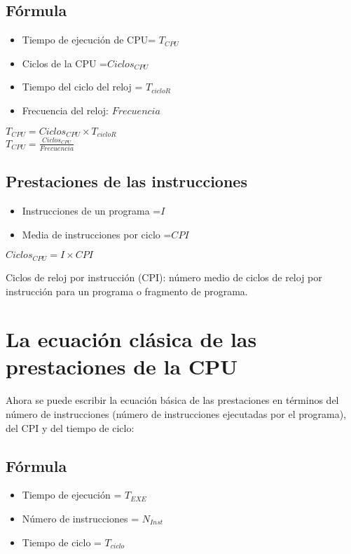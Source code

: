 \documentclass[12pt]{article}
\begin{document}
 \subsection*{Fórmula}
\begin{itemize}
    \item Tiempo de ejecución de CPU= $T_{CPU}$
    \item Ciclos de la CPU =$Ciclos_{CPU}$
    \item  Tiempo del ciclo del reloj = $T_{cicloR}$
    \item Frecuencia del reloj: $Frecuencia$
\end{itemize}

\begin{spacing}{3.0} %
        \begin{center}  
            $T_{CPU} = Ciclos_{CPU} \times T_{cicloR}$\\
            $T_{CPU} = \displaystyle\frac{Ciclos_{CPU}}{Frecuencia}$
        \end{center}
    \end{spacing}
    
\subsection*{ Prestaciones de las instrucciones}
\begin{itemize}
    \item Instrucciones de un programa =$I$
    \item Media de instrucciones por ciclo =$CPI$
\end{itemize}

        \begin{center}  
            $Ciclos_{CPU} = I \times CPI$
        \end{center}

         Ciclos de reloj por instrucción (CPI): número medio de ciclos de reloj 
        por instrucción para un programa o fragmento de programa.
        
    \section{La ecuación clásica de las prestaciones de la CPU}
    Ahora se puede escribir la ecuación básica de las prestaciones en términos del
    número de instrucciones (número de instrucciones ejecutadas por el programa),
    del CPI y del tiempo de ciclo:
    
    \subsection*{Fórmula}
    \begin{itemize}
        \item Tiempo de ejecución = $T_{EXE}$
        \item Número de instrucciones = $N_{Inst}$
        \item Tiempo de ciclo = $T_{ciclo}$
    \end{itemize}
\end{document}

